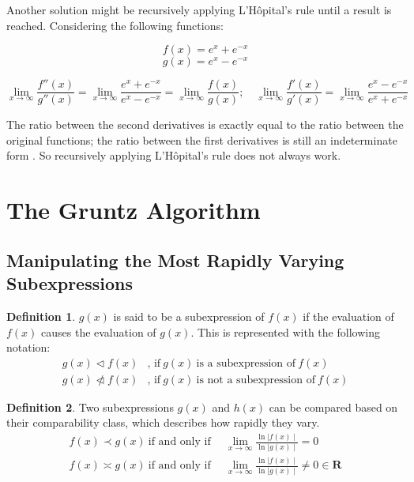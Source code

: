 \documentclass{article}
\theoremstyle{plain}
\theoremstyle{definition}
\newtheorem*{defn*}{Definition}
\theoremstyle{algorithm}
\begin{document}
	Another solution might be recursively applying L'Hôpital's rule \cite{wiki:hopital} until a result is reached.
	Considering the following functions:
	
	\[
	f(x) = e^{x} + e^{-x}
	\] 
	\[
	g(x) = e^{x} - e^{-x}
	\]
	
	\[
	\lim_{x \to \infty}{\frac{f''(x)}{g''(x)}} = \lim_{x \to \infty}{\frac{e^{x} + e^{-x}}{e^{x} - e^{-x}}} = \lim_{x \to \infty}{\frac{f(x)}{g(x)}}; \quad \lim_{x \to \infty}{\frac{f'(x)}{g'(x)}} = \lim_{x \to \infty}{\frac{e^{x} - e^{-x}}{e^{x} + e^{-x}}}
	\]
	
	The ratio between the second derivatives is exactly equal to the ratio between the original functions; the ratio between the first derivatives is still an indeterminate form \cite{wiki:ind}.
	So recursively applying L'Hôpital's rule does not always work.
	
	\section{The Gruntz Algorithm}
	
	\subsection{Manipulating the Most Rapidly Varying Subexpressions}
	
	\begin{defn*}
		\(g(x)\) is said to be a subexpression of \(f(x)\) if the evaluation of \(f(x)\) causes the evaluation of \(g(x)\). This is represented with the following notation:
		\[
		\begin{aligned}
			g(x) \triangleleft f(x)&\text{, if} \: g(x) \: \text{is a subexpression of} \: f(x) \\
			g(x) \ntriangleleft f(x)&\text{, if} \: g(x) \: \text{is not a subexpression of} \: f(x)
		\end{aligned}
		\]
	\end{defn*}
	
	\begin{defn*}
		Two subexpressions \(g(x)\) and \(h(x)\) can be compared based on their comparability class, which describes how rapidly they vary.
		\[
		\begin{aligned}
			f(x) \prec g(x) \: \text{if and only if} \enspace &\lim_{x \to \infty}{\frac{\ln{\mid f(x)\mid}}{\ln{\mid g(x)\mid}}} = 0 \\ 
			f(x) \asymp g(x) \: \text{if and only if} \enspace &\lim_{x \to \infty}{\frac{\ln{\mid f(x)\mid}}{\ln{\mid g(x)\mid}}} \neq 0 \in \mathbf{R}
		\end{aligned} \tag{2} \label{defn:comparability}
		\] 
	\end{defn*} 
	
\end{document}
